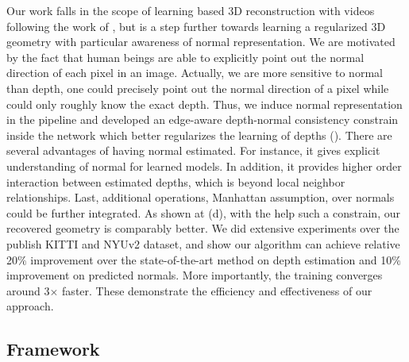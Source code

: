 Our work falls in the scope of learning based 3D reconstruction with videos following the work of \cite{zhou2017unsupervised}, but is a step further towards learning a regularized 3D geometry with particular awareness of normal representation. 
We are motivated by the fact that human beings are able to explicitly point out the normal direction of each pixel in an image. Actually, we are more sensitive to normal than depth, \eg one could precisely point out the normal direction of a pixel while could only roughly know the exact depth. 
Thus, we induce normal representation in the pipeline and developed an edge-aware depth-normal consistency constrain inside the network which better regularizes the learning of depths (). 
There are several advantages of having normal estimated. For instance, it gives explicit understanding of normal for learned models.  In addition, it provides higher order interaction between estimated depths, which is beyond local neighbor relationships. Last, additional operations, \eg Manhattan assumption, over normals could be further integrated.
As shown at (d), with the help such a constrain, our recovered geometry is comparably better. We did extensive experiments over the publish KITTI and NYUv2 dataset, and show our algorithm can achieve relative 20$\%$ improvement over the state-of-the-art method on depth estimation and 10$\%$ improvement on predicted normals. More importantly, the training converges around 3$\times$ faster. These demonstrate the efficiency and effectiveness of our approach.




\vspace{-0.6\baselineskip}
\subsection{Framework}
\label{sub:framework}
\vspace{-0.3\baselineskip}

